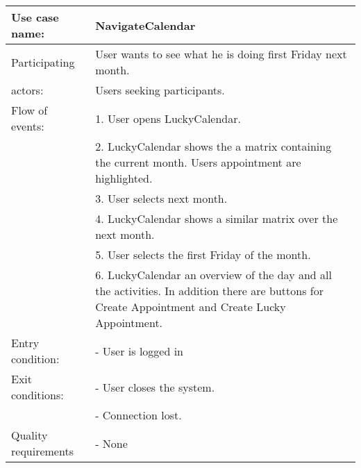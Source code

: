 {\tabulinesep=1.2mm
\begin{tabu}{ | p{3cm} | p{13cm} |}
    \hline
    Use case name: 			& 		NavigateCalendar\\ \hline
    Participating  			& 		User wants to see what he is doing first Friday next month. \\
    actors:					&		Users seeking participants.\\ \hline
    Flow of events: 		& 		1. User opens LuckyCalendar. \\
							&		2. LuckyCalendar shows the a matrix containing the current month. Users appointment are highlighted.\\
							&		3. User selects next month.\\
							&		4. LuckyCalendar shows a similar matrix over the next month.\\
							&		5. User selects the first Friday of the month.\\
							&		6. LuckyCalendar an overview of the day and all the activities. In addition there are buttons for Create Appointment and Create Lucky Appointment.\\ \hline
    Entry condition: 		& 		- User is logged in  \\ \hline
	Exit conditions: 		&		- User closes the system.\\
							&		- Connection lost.\\\hline
	Quality requirements	&	 	- None \\\hline
\end{tabu}
}